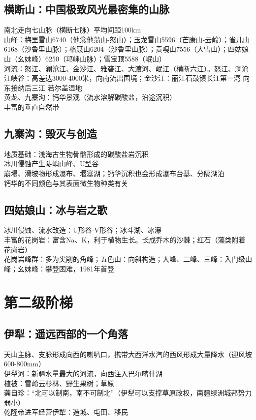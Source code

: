 \subsection*{横断山：中国极致风光最密集的山脉}

南北走向七山脉（横断七脉）平均间距100km\\
山峰：梅里雪山6740（他念他翁山-怒山）；玉龙雪山5596（芒康山-云岭）；雀儿山6168（沙鲁里山脉）；格聂山6204（沙鲁里山脉）；贡嘎山7556（大雪山）；四姑娘山（幺妹峰）6250（邛崃山脉）；雪宝顶5588（岷山）\\
河流：怒江、澜沧江、金沙江、雅砻江、大渡河、岷江（横断六江）。怒江、澜沧江峡谷：高差达3000-4000米，向南流出国境；金沙江：丽江石鼓镇长江第一湾 向东接纳后三江
若尔盖湿地\\
黄龙、九寨沟：钙华景观（流水溶解碳酸盐，沿途沉积）\\
丰富的垂直自然带

\subsection*{九寨沟：毁灭与创造}

地质基础：浅海古生物骨骼形成的碳酸盐岩沉积\\
冰川侵蚀产生陡峭山峰、U型谷\\
崩塌、滑坡物形成瀑布、堰塞湖；钙华沉积也会形成瀑布台基、分隔湖泊\\
钙华的不同颜色与其表面微生物种类有关

\subsection*{四姑娘山：冰与岩之歌}

冰川侵蚀、流水改造：U形谷-V形谷；冰斗湖、冰瀑\\
丰富的花岗岩：富含Na、K，利于植物生长。长成乔木的沙棘；红石（藻类附着花岗岩）\\
花岗岩峰群：多为尖削的角峰；五色山：向斜构造；大峰、二峰、三峰：入门级山峰；幺妹峰：攀登困难，1981年首登

\section{第二级阶梯}

\subsection*{伊犁：遥远西部的一个角落}

天山主脉、支脉形成向西的喇叭口，携带大西洋水汽的西风形成大量降水（迎风坡600-800mm）\\
伊犁河：新疆水量最大的河流，向西注入巴尔喀什湖\\
植被：雪岭云杉林、野生果树；草原\\
龚自珍：“北可以制南，南不可制北”（伊犁可以支撑草原政权，南疆绿洲城邦势力弱小）\\
乾隆帝进军经营伊犁：造城、屯田、移民

